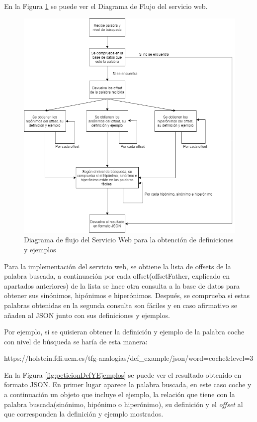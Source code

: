 En la Figura \ref{fig:swdef} se puede ver el Diagrama de Flujo del servicio web.
\begin{figure}[!h]
	\includegraphics[width=.9\textwidth]{Imagenes/Bitmap/Capitulo4/ServiciosWeb/DiagramaFlujoDefinicionYEjemplo.png}
	\centering
	\caption{Diagrama de flujo del Servicio Web para la obtención de definiciones y ejemplos}
	\label{fig:swdef}
\end{figure}

Para la implementación del servicio web, se obtiene la lista de offsets de la palabra buscada, a continuación por cada offset(offsetFather, explicado en apartados anteriores) de la lista se hace otra consulta a la base de datos para obtener sus sinónimos, hipónimos e hiperónimos. Después, se comprueba si estas palabras obtenidas en la segunda consulta son fáciles y en caso afirmativo se añaden al JSON junto con sus definiciones y ejemplos.

Por ejemplo, si se quisieran obtener la definición y ejemplo de la palabra coche con nivel de búsqueda se haría de esta manera:

https://holstein.fdi.ucm.es/tfg-analogias/def\_example/json/word=coche\&level=3

En la Figura \ref{fig:peticionDefYEjemplos} se puede ver el resultado obtenido en formato JSON. En primer lugar aparece la palabra buscada, en este caso coche y a continuación un objeto que incluye el ejemplo, la relación que tiene con la palabra buscada(sinónimo, hipónimo o hiperónimo), su definición y el \textit{offset} al que corresponden la definición y ejemplo mostrados.

